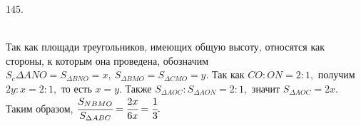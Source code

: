 145. \begin{figure}[ht!]
\end{figure}\\
Так как площади треугольников, имеющих общую высоту, относятся как стороны, к которым она проведена, обозначим $S_c{\Delta ANO}=S_{\Delta BNO}=x,\ S_{\Delta BMO}=S_{\Delta CMO}=y.$ Так как $CO:ON=2:1,$ получим $2y:x=2:1,$ то есть $x=y.$ Также $S_{\Delta AOC}:S_{\Delta AON}=2:1,$ значит $S_{\Delta AOC}=2x.$ Таким образом, $\cfrac{S_{NBMO}}{S_{\Delta ABC}}=\cfrac{2x}{6x}=\cfrac{1}{3}.$\\
